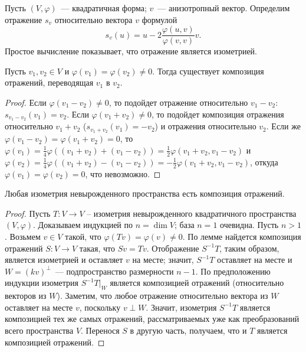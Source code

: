 \documentclass[a4paper,oneside,12pt]{article}
\theoremstyle{plain} { \swapnumbers
\newtheorem{theorem}{Теорема}[subsection]
\newtheorem{corollary}[theorem]{Следствие}
\newtheorem{lemma}[theorem]{Лемма}
\newtheorem{proposition}[theorem]{Утверждение}
\newtheorem{claim}[theorem]{Факт}
}
\theoremstyle{definition} { \swapnumbers
\newtheorem{definition}[theorem]{Определение}
\newtheorem{notation}[theorem]{Обозначение}
\newtheorem{remark}[theorem]{Замечание}
\newtheorem{remarks}[theorem]{Замечания}
\newtheorem{example}[theorem]{Пример}
\newtheorem{examples}[theorem]{Примеры}
\newtheorem{sssection}[theorem]{}
}
\def\ph{\varphi}
\begin{document}
Пусть $(V,\ph)$~--- квадратичная форма; $v$~--- анизотропный вектор. Определим отражение $s_v$
относительно вектора $v$ формулой
$$
s_v(u)=u-2\frac{\ph(u,v)}{\ph(v,v)}v.
$$
Простое вычисление показывает, что отражение является изометрией.
\begin{lemma}
Пусть $v_1,v_2\in V$ и $\ph(v_1)=\ph(v_2)\neq 0$. Тогда существует композиция отражений, 
переводящая $v_1$ в $v_2$.
\end{lemma}
\begin{proof}
Если $\ph(v_1-v_2)\neq 0$, то подойдет отражение относительно $v_1-v_2$: $s_{v_1-v_2}(v_1)=v_2$.
Если $\ph(v_1+v_2)\neq 0$, то подойдет композиция отражения относительно $v_1+v_2$ ($s_{v_1+v_2}(v_1)=-v_2$)
и отражения относительно $v_2$.
Если же $\ph(v_1-v_2)=\ph(v_1+v_2)=0$, то $\ph(v_1)=\frac14\ph((v_1+v_2)+(v_1-v_2))=\frac12\ph(v_1+v_2,v_1-v_2)$
и $\ph(v_2)=\frac14\ph((v_1+v_2)-(v_1-v_2))=-\frac12\ph(v_1+v_2,v_1-v_2)$, откуда $\ph(v_1)=\ph(v_2)=0$,
что невозможно.
\end{proof}

\begin{corollary}
Любая изометрия невырожденного пространства есть композиция отражений.
\end{corollary}
\begin{proof}
Пусть $T:V\to V$ -- изометрия невырожденного квадратичного пространства $(V,\ph)$.
Доказываем индукцией по $n=\dim V$; база $n=1$ очевидна. Пусть $n>1$.
Возьмем $v\in V$ такой, что $\ph(Tv)=\ph(v)\neq 0$. По лемме найдется
композиция отражений $S\colon V\to V$ такая, что $Sv=Tv$. Отображение $S^{-1}T$, таким образом,
является изометрией и оставляет $v$ на месте; значит, $S^{-1}T$ оставляет на месте и $W=(kv)^\perp$~---
подпространство размерности $n-1$. По предположению индукции изометрия $S^{-1}T|_W$ является композицией
отражений (относительно векторов из $W$). Заметим, что любое отражение относительно вектора из $W$
оставляет на месте $v$, поскольку $v\perp W$. Значит, изометрия $S^{-1}T$ является композицией
тех же самых отражений, рассматриваемых уже как преобразований всего пространства $V$.
Перенося $S$ в другую часть, получаем, что и $T$ является композицией отражений.
\end{proof}
\end{document}
